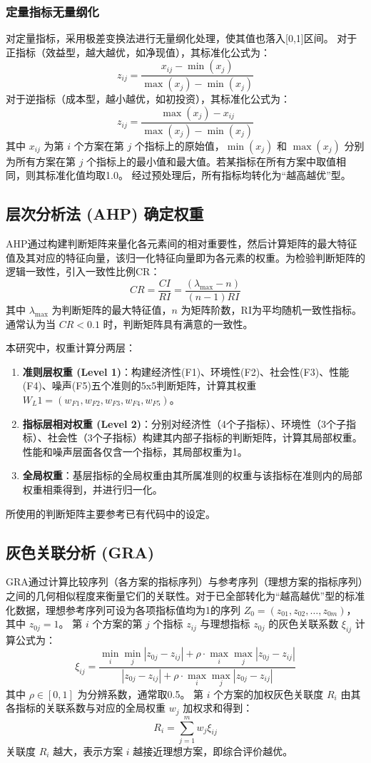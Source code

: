 \documentclass[12pt]{ctexart}
\begin{document}
\subsubsection{定量指标无量纲化}
对定量指标，采用极差变换法进行无量纲化处理，使其值也落入[0,1]区间。
对于正指标（效益型，越大越优，如净现值），其标准化公式为：
\[ z_{ij} = \frac{x_{ij} - \min(x_j)}{\max(x_j) - \min(x_j)} \]
对于逆指标（成本型，越小越优，如初投资），其标准化公式为：
\[ z_{ij} = \frac{\max(x_j) - x_{ij}}{\max(x_j) - \min(x_j)} \]
其中 \(x_{ij}\) 为第 \(i\) 个方案在第 \(j\) 个指标上的原始值，\(\min(x_j)\) 和 \(\max(x_j)\) 分别为所有方案在第 \(j\) 个指标上的最小值和最大值。若某指标在所有方案中取值相同，则其标准化值均取1.0。
经过预处理后，所有指标均转化为“越高越优”型。

\subsection{层次分析法 (AHP) 确定权重}
AHP通过构建判断矩阵来量化各元素间的相对重要性，然后计算矩阵的最大特征值及其对应的特征向量，该归一化特征向量即为各元素的权重。为检验判断矩阵的逻辑一致性，引入一致性比例CR：
\[ CR = \frac{CI}{RI} = \frac{(\lambda_{\max} - n)}{(n-1)RI} \]
其中 \(\lambda_{\max}\) 为判断矩阵的最大特征值，\(n\) 为矩阵阶数，RI为平均随机一致性指标。通常认为当 \(CR < 0.1\) 时，判断矩阵具有满意的一致性。

本研究中，权重计算分两层：
\begin{enumerate}
    \item \textbf{准则层权重 (Level 1)}：构建经济性(F1)、环境性(F2)、社会性(F3)、性能(F4)、噪声(F5)五个准则的5x5判断矩阵，计算其权重 \(W_L1 = (w_{F1}, w_{F2}, w_{F3}, w_{F4}, w_{F5})\)。
    \item \textbf{指标层相对权重 (Level 2)}：分别对经济性（4个子指标）、环境性（3个子指标）、社会性（3个子指标）构建其内部子指标的判断矩阵，计算其局部权重。性能和噪声层面各仅含一个指标，其局部权重为1。
    \item \textbf{全局权重}：基层指标的全局权重由其所属准则的权重与该指标在准则内的局部权重相乘得到，并进行归一化。
\end{enumerate}
所使用的判断矩阵主要参考已有代码中的设定。

\subsection{灰色关联分析 (GRA)}
GRA通过计算比较序列（各方案的指标序列）与参考序列（理想方案的指标序列）之间的几何相似程度来衡量它们的关联性。对于已全部转化为“越高越优”型的标准化数据，理想参考序列可设为各项指标值均为1的序列 \(Z_0 = (z_{01}, z_{02}, \dots, z_{0m})\)，其中 \(z_{0j}=1\)。
第 \(i\) 个方案的第 \(j\) 个指标 \(z_{ij}\) 与理想指标 \(z_{0j}\) 的灰色关联系数 \(\xi_{ij}\) 计算公式为：
\[ \xi_{ij} = \frac{\min_i \min_j |z_{0j} - z_{ij}| + \rho \cdot \max_i \max_j |z_{0j} - z_{ij}|}{|z_{0j} - z_{ij}| + \rho \cdot \max_i \max_j |z_{0j} - z_{ij}|} \]
其中 \(\rho \in [0,1]\) 为分辨系数，通常取0.5。
第 \(i\) 个方案的加权灰色关联度 \(R_i\) 由其各指标的关联系数与对应的全局权重 \(w_j\) 加权求和得到：
\[ R_i = \sum_{j=1}^{m} w_j \xi_{ij} \]
关联度 \(R_i\) 越大，表示方案 \(i\) 越接近理想方案，即综合评价越优。
\end{document}
